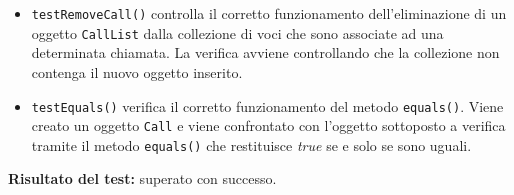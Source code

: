 \begin{itemize}
\begin{itemize}
\item \texttt{testRemoveCall()} controlla il corretto funzionamento dell'eliminazione di un oggetto \texttt{CallList} dalla collezione di voci che sono associate ad una determinata chiamata. La verifica avviene controllando che la collezione non contenga il nuovo oggetto inserito.

\item \texttt{testEquals()}
verifica il corretto funzionamento del metodo \texttt{equals()}. Viene creato un oggetto \texttt{Call} e viene confrontato con l'oggetto sottoposto a verifica tramite il metodo \texttt{equals()} che restituisce \textit{true} se e solo se sono uguali.
 
\end{itemize}
\textbf{Risultato del test:} superato con successo.


\end{itemize}



